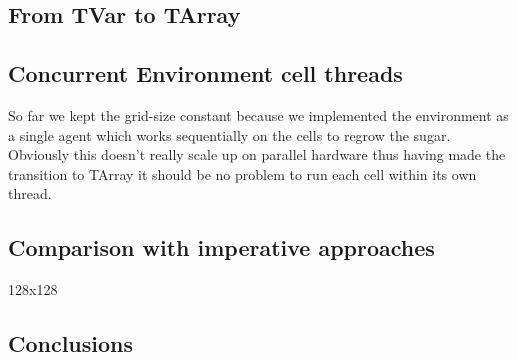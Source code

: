 \subsection{From TVar to TArray}

\subsection{Concurrent Environment cell threads}
So far we kept the grid-size constant because we implemented the environment as a single agent which works sequentially on the cells to regrow the sugar. Obviously this doesn't really scale up on parallel hardware thus having made the transition to TArray it should be no problem to run each cell within its own thread.

\subsection{Comparison with imperative approaches}
128x128

\subsection{Conclusions}